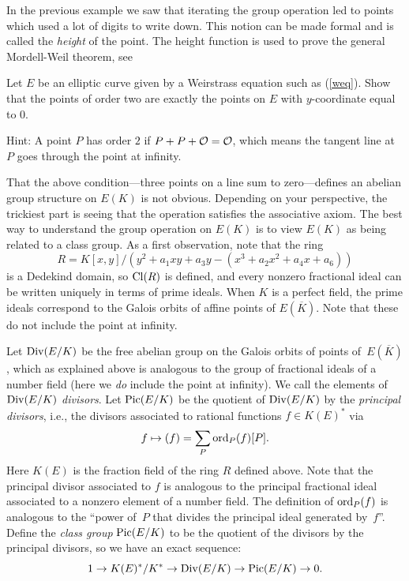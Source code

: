 \begin{remark}
In the previous example we saw that iterating the
group operation led to points which used a lot of digits
to write down. This notion can be made formal and is called
the \emph{height} of the point. The height function is used
to prove the general Mordell-Weil theorem, see
\cite[Ch. VIII.4]{silverman:aec}
\end{remark}

\begin{exercise}\label{ex:ec2torsion}
	Let $E$ be an elliptic curve given by a
	Weirstrass equation such as (\ref{weq}).
	Show that the points of order two are exactly
	the points on $E$ with $y$-coordinate equal to
	$0$.

	Hint: A point $P$ has order $2$ if
	$P + P + \mathcal{O} = \mathcal{O}$, which means the tangent line
	at $P$ goes through the point at infinity.
\end{exercise}

That the above condition---three points on a line sum to
zero---defines an abelian group structure on $E(K)$ is not obvious.
Depending on your perspective, the trickiest part is seeing that the
operation satisfies the associative axiom.  The best way to understand
the group operation on $E(K)$ is to view $E(K)$ as being related to a
class group.  As a first observation, note that the ring
$$
 R = K[x,y]/(y^2 +a_1 xy + a_3 y - (x^3 + a_2 x^2 + a_4 x + a_6))
$$
is a Dedekind domain, so $\operatorname{Cl}(R)$ is defined, and every nonzero
fractional ideal can be written uniquely in terms of prime ideals.
When $K$ is a perfect field, the prime ideals correspond to the Galois
orbits of affine points of $E(\overline{K})$.
Note that these do not include the point at infinity.

Let $\operatorname{Div}(E/K)$ be the free abelian group on the Galois orbits of
points of~$E(\overline{K})$, which as explained above is analogous to
the group of fractional ideals of a number field (here we {\em do}
include the point at infinity).
We call the elements of $\operatorname{Div}(E/K)$
{\em divisors}.  Let $\operatorname{Pic}(E/K)$ be the quotient of $\operatorname{Div}(E/K)$ by the
\emph{principal divisors}, i.e., the divisors associated to rational functions
$f\in K(E)^*$ via
$$
 f \mapsto (f) = \sum_{P} \operatorname{ord}_P(f) [P].
$$
Here $K(E)$ is the fraction field of the ring $R$ defined above.
Note that the principal divisor associated to $f$ is analogous to the
principal fractional ideal associated to a nonzero element of a number
field.  The definition of $\operatorname{ord}_P(f)$ is analogous to the ``power
of~$P$ that divides the principal ideal generated by~$f$''.
Define the \emph{class group} $\operatorname{Pic}(E/K)$ to be the quotient of the
divisors by the principal divisors, so we have
an exact sequence:
$$
  1\to K(E)^*/K^* \to \operatorname{Div}(E/K) \to \operatorname{Pic}(E/K) \to 0.
$$

